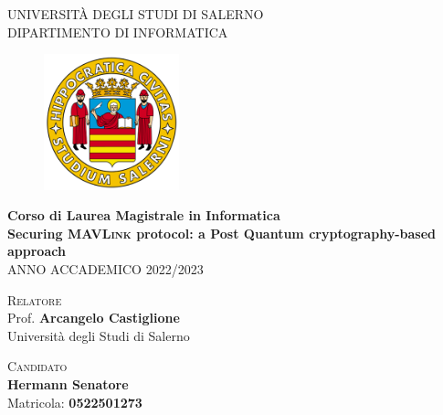 \documentclass[a4paper, 12pt, oneside]{article}
\begin{document}
\begin{titlepage}
    \begin{center}
        \LARGE{\uppercase{Università degli Studi di Salerno}}\\
        \vspace{5mm}
    	\uppercase{\normalsize Dipartimento di Informatica }\\
    \end{center}
    \begin{figure}[H]
        \centering
        \includegraphics[width=0.35\textwidth]{logo_unisa}
    \end{figure}
    
    \begin{center}
        \normalsize{\textbf{Corso di Laurea Magistrale in Informatica}}\\
    	\vspace{10mm}
    	\LARGE{\textbf{Securing \textsc{MAVLink} protocol: a Post Quantum cryptography-based approach}}\\
    	\vspace{3mm}
        \large{\uppercase{Anno Accademico 2022/2023}}
    \end{center}

    \vspace{50mm}
    \noindent
    \begin{minipage}[t]{0.4\textwidth}
    	\textsc{Relatore}\\Prof. \textbf{Arcangelo Castiglione}\\
        \small Università degli Studi di Salerno
    	\vspace{12mm}\\
    \end{minipage}
    \hfill
    \begin{minipage}[t]{0.4\textwidth}\raggedleft
    	\textsc{Candidato} \\\textbf{Hermann Senatore}\\\small Matricola: \textbf{0522501273}
    \end{minipage}
\end{titlepage}
\end{document}
